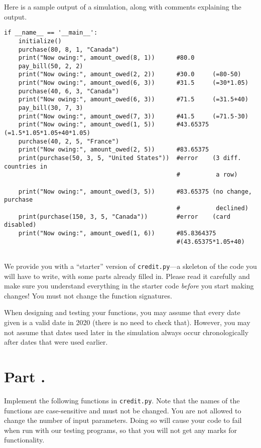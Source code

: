 \documentclass[11pt]{article}
\let\altemph\textsl
\let\code\texttt
\newcounter{questionnumber}
\newcommand*{\question}[2][]
   {\refstepcounter{questionnumber}\section*
    {Part \thequestionnumber.\quad
        \ifx\empty#1\empty\else[#1 marks]\quad\fi#2}}
\begin{document}
\noindent Here is a  sample output of a simulation, along with comments explaining the output.
\begin{verbatim}
if __name__ == '__main__':
    initialize()
    purchase(80, 8, 1, "Canada")
    print("Now owing:", amount_owed(8, 1))      #80.0
    pay_bill(50, 2, 2)
    print("Now owing:", amount_owed(2, 2))      #30.0     (=80-50)
    print("Now owing:", amount_owed(6, 3))      #31.5     (=30*1.05)
    purchase(40, 6, 3, "Canada")
    print("Now owing:", amount_owed(6, 3))      #71.5     (=31.5+40)
    pay_bill(30, 7, 3)
    print("Now owing:", amount_owed(7, 3))      #41.5     (=71.5-30)
    print("Now owing:", amount_owed(1, 5))      #43.65375 (=1.5*1.05*1.05+40*1.05)
    purchase(40, 2, 5, "France")
    print("Now owing:", amount_owed(2, 5))      #83.65375 
    print(purchase(50, 3, 5, "United States"))  #error    (3 diff. countries in 
                                                #          a row)
                                                
    print("Now owing:", amount_owed(3, 5))      #83.65375 (no change, purchase
                                                #          declined)
    print(purchase(150, 3, 5, "Canada"))        #error    (card disabled)
    print("Now owing:", amount_owed(1, 6))      #85.8364375 
                                                #(43.65375*1.05+40)
                                            

\end{verbatim}


{}  We provide you with a ``starter'' version of \code{credit.py}---a 
skeleton of the code you will have to write, with some parts already 
filled in.  Please read it carefully and make sure you understand 
everything in the starter code \altemph{before} you start making changes! 
You must not change the function signatures. 

{}  When designing and testing your functions, you may assume that every date given is a valid date in 2020 (there is no need to check that). However, you may not assume that dates used later in the simulation always occur chronologically after dates that were used earlier.


\question{}

Implement the following functions in \code{credit.py}.  Note that the 
names of the functions are case-sensitive and must not be changed.  You are 
not allowed to change the number of input parameters.  Doing so will cause 
your code to fail when run with our testing programs, so that you will not 
get any marks for functionality.
\end{document}
